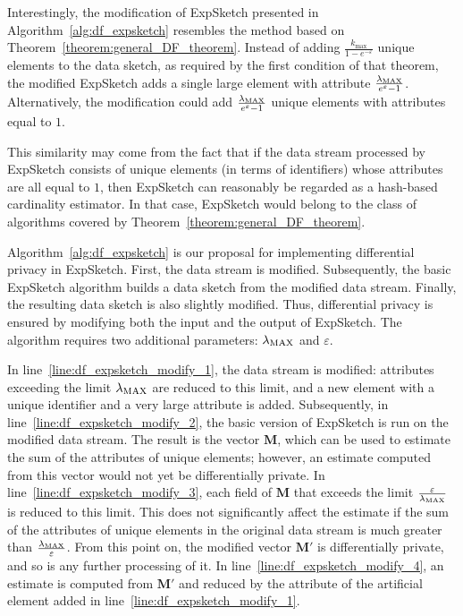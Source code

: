 Interestingly, the modification of ExpSketch presented in Algorithm~\ref{alg:df_expsketch} resembles the method based on Theorem~\ref{theorem:general_DF_theorem}. Instead of adding $\frac{k_{\max}}{1 - e^{-\varepsilon}}$ unique elements to the data sketch, as required by the first condition of that theorem, the modified ExpSketch adds a single large element with attribute $\frac{\lambda_{\mathrm{MAX}}}{e^\varepsilon - 1}$. Alternatively, the modification could add $\frac{\lambda_{\mathrm{MAX}}}{e^\varepsilon - 1}$ unique elements with attributes equal to $1$.

This similarity may come from the fact that if the data stream processed by ExpSketch consists of unique elements (in terms of identifiers) whose attributes are all equal to $1$, then ExpSketch can reasonably be regarded as a hash-based cardinality estimator. In that case, ExpSketch would belong to the class of algorithms covered by Theorem~\ref{theorem:general_DF_theorem}.

Algorithm~\ref{alg:df_expsketch} is our proposal for implementing differential privacy in ExpSketch. First, the data stream is modified. Subsequently, the basic ExpSketch algorithm builds a data sketch from the modified data stream. Finally, the resulting data sketch is also slightly modified. Thus, differential privacy is ensured by modifying both the input and the output of ExpSketch. The algorithm requires two additional parameters: $\lambda_{\mathrm{MAX}}$ and $\varepsilon$.

In line~\ref{line:df_expsketch_modify_1}, the data stream is modified: attributes exceeding the limit $\lambda_{\mathrm{MAX}}$ are reduced to this limit, and a new element with a unique identifier and a very large attribute is added. Subsequently, in line~\ref{line:df_expsketch_modify_2}, the basic version of ExpSketch is run on the modified data stream. The result is the vector $\mathbf{M}$, which can be used to estimate the sum of the attributes of unique elements; however, an estimate computed from this vector would not yet be differentially private. In line~\ref{line:df_expsketch_modify_3}, each field of $\mathbf{M}$ that exceeds the limit $\frac{\varepsilon}{\lambda_{\mathrm{MAX}}}$ is reduced to this limit. This does not significantly affect the estimate if the sum of the attributes of unique elements in the original data stream is much greater than $\frac{\lambda_{\mathrm{MAX}}}{\varepsilon}$. From this point on, the modified vector $\mathbf{M}'$ is differentially private, and so is any further processing of it. In line~\ref{line:df_expsketch_modify_4}, an estimate is computed from $\mathbf{M}'$ and reduced by the attribute of the artificial element added in line~\ref{line:df_expsketch_modify_1}.

